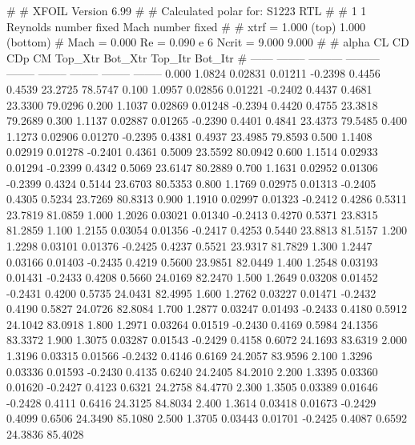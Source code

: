 #  
#       XFOIL         Version 6.99
#  
# Calculated polar for: S1223 RTL                                       
#  
# 1 1 Reynolds number fixed          Mach number fixed         
#  
# xtrf =   1.000 (top)        1.000 (bottom)  
# Mach =   0.000     Re =     0.090 e 6     Ncrit =   9.000  9.000
#  
#   alpha    CL        CD       CDp       CM     Top_Xtr  Bot_Xtr  Top_Itr  Bot_Itr
#  ------ -------- --------- --------- -------- -------- -------- -------- --------
   0.000   1.0824   0.02831   0.01211  -0.2398   0.4456   0.4539  23.2725  78.5747
   0.100   1.0957   0.02856   0.01221  -0.2402   0.4437   0.4681  23.3300  79.0296
   0.200   1.1037   0.02869   0.01248  -0.2394   0.4420   0.4755  23.3818  79.2689
   0.300   1.1137   0.02887   0.01265  -0.2390   0.4401   0.4841  23.4373  79.5485
   0.400   1.1273   0.02906   0.01270  -0.2395   0.4381   0.4937  23.4985  79.8593
   0.500   1.1408   0.02919   0.01278  -0.2401   0.4361   0.5009  23.5592  80.0942
   0.600   1.1514   0.02933   0.01294  -0.2399   0.4342   0.5069  23.6147  80.2889
   0.700   1.1631   0.02952   0.01306  -0.2399   0.4324   0.5144  23.6703  80.5353
   0.800   1.1769   0.02975   0.01313  -0.2405   0.4305   0.5234  23.7269  80.8313
   0.900   1.1910   0.02997   0.01323  -0.2412   0.4286   0.5311  23.7819  81.0859
   1.000   1.2026   0.03021   0.01340  -0.2413   0.4270   0.5371  23.8315  81.2859
   1.100   1.2155   0.03054   0.01356  -0.2417   0.4253   0.5440  23.8813  81.5157
   1.200   1.2298   0.03101   0.01376  -0.2425   0.4237   0.5521  23.9317  81.7829
   1.300   1.2447   0.03166   0.01403  -0.2435   0.4219   0.5600  23.9851  82.0449
   1.400   1.2548   0.03193   0.01431  -0.2433   0.4208   0.5660  24.0169  82.2470
   1.500   1.2649   0.03208   0.01452  -0.2431   0.4200   0.5735  24.0431  82.4995
   1.600   1.2762   0.03227   0.01471  -0.2432   0.4190   0.5827  24.0726  82.8084
   1.700   1.2877   0.03247   0.01493  -0.2433   0.4180   0.5912  24.1042  83.0918
   1.800   1.2971   0.03264   0.01519  -0.2430   0.4169   0.5984  24.1356  83.3372
   1.900   1.3075   0.03287   0.01543  -0.2429   0.4158   0.6072  24.1693  83.6319
   2.000   1.3196   0.03315   0.01566  -0.2432   0.4146   0.6169  24.2057  83.9596
   2.100   1.3296   0.03336   0.01593  -0.2430   0.4135   0.6240  24.2405  84.2010
   2.200   1.3395   0.03360   0.01620  -0.2427   0.4123   0.6321  24.2758  84.4770
   2.300   1.3505   0.03389   0.01646  -0.2428   0.4111   0.6416  24.3125  84.8034
   2.400   1.3614   0.03418   0.01673  -0.2429   0.4099   0.6506  24.3490  85.1080
   2.500   1.3705   0.03443   0.01701  -0.2425   0.4087   0.6592  24.3836  85.4028
